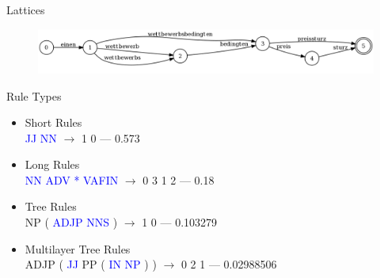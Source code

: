 \documentclass[18pt]{beamer}
\begin{document}
\begin{frame}{Lattices}
\begin{figure}
\centering
\includegraphics[scale=0.25]{lattices.png}
\end{figure}
\end{frame}


\begin{frame}{Rule Types}
\begin{itemize}
\item Short Rules\\
\hspace{2em}\textcolor{blue}{JJ NN} $\rightarrow$ 1 0 --- 0.573 \\
\item Long Rules\\
\hspace{2em}\textcolor{blue}{NN ADV * VAFIN} $\rightarrow$ 0 3 1 2 --- 0.18\\
\item Tree Rules\\
\hspace{2em}NP ( \textcolor{blue}{ADJP NNS} ) $\rightarrow$ 1 0  --- 0.103279\\
\item Multilayer Tree Rules\\
\hspace{2em}ADJP ( \textcolor{blue}{JJ} PP ( \textcolor{blue}{IN NP} ) ) $\rightarrow$ 0 2 1 --- 0.02988506\\
\end{itemize}
\end{frame}
\end{document}
